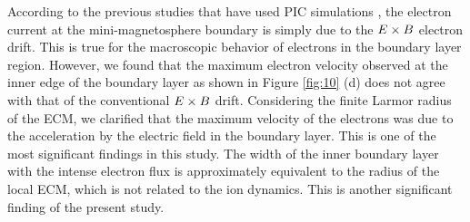 \documentclass[draft,jgrga]{agutex2015}
\begin{document}
\begin{article}

%
%

According to the previous studies that have used PIC simulations \citep[e.g.,][]{Deca2014},
the electron current at the mini-magnetosphere boundary is 
simply due to 
the $\mbox{\boldmath $E$} \times \mbox{\boldmath $B$}$ electron drift.
This is true for the macroscopic behavior of electrons in the boundary layer region.
However, 
we found that 
the maximum electron velocity observed at the inner edge of the boundary layer
as shown in Figure \ref{fig:10} (d) 
does not agree with that of the conventional 
$\mbox{\boldmath $E$} \times \mbox{\boldmath $B$}$ drift.
Considering the finite Larmor radius of the ECM, 
we clarified that the maximum velocity of the electrons was 
due to 
the acceleration by the electric field in the boundary layer.
This is one of the most significant findings in this study.
The width of the inner boundary layer with the intense electron flux 
is approximately equivalent to the radius of the local ECM, 
which is not related to the ion dynamics.
This is another significant finding of the present study.
%
%


\end{article}
\end{document}
